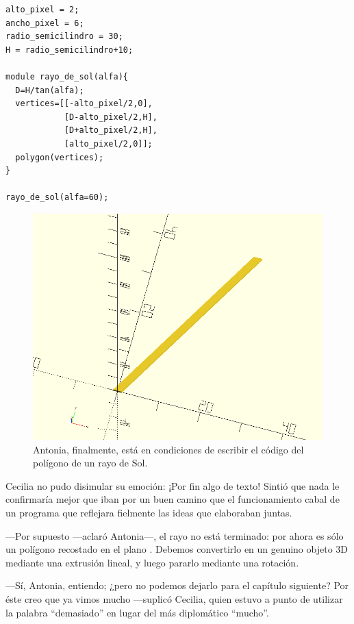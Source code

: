     \begin{lstlisting}
alto_pixel = 2;
ancho_pixel = 6;
radio_semicilindro = 30;
H = radio_semicilindro+10;

module rayo_de_sol(alfa){
  D=H/tan(alfa);
  vertices=[[-alto_pixel/2,0],
            [D-alto_pixel/2,H],
            [D+alto_pixel/2,H],
            [alto_pixel/2,0]];
  polygon(vertices);
}
 
rayo_de_sol(alfa=60);
\end{lstlisting}

\begin{figure}[ht]
  \centering
  \includegraphics[width=.65\textwidth]{imagenes/rayo-de-sol-1}
  \caption{Antonia, finalmente, está en condiciones de escribir el
    código del polígono de un rayo de Sol.}
  \label{fig:rayo-de-sol-1}
\end{figure}


Cecilia no pudo disimular su emoción: ¡Por fin algo de texto!  Sintió
que nada le confirmaría mejor que iban por un buen camino que el
funcionamiento cabal de un programa que reflejara fielmente las ideas
que elaboraban juntas.

---Por supuesto ---aclaró Antonia---, el rayo no está terminado: por
ahora es sólo un polígono recostado en el plano . Debemos
convertirlo en un genuino objeto 3D mediante una extrusión lineal, y
luego pararlo mediante una rotación.

---Sí, Antonia, entiendo; ¿pero no podemos dejarlo para el capítulo
siguiente? Por éste creo que ya vimos mucho \mbox{---su}\-pli\-có Cecilia, quien
estuvo a punto de utilizar la palabra ``demasiado'' en lugar del más
diplomático ``mucho''.
  

